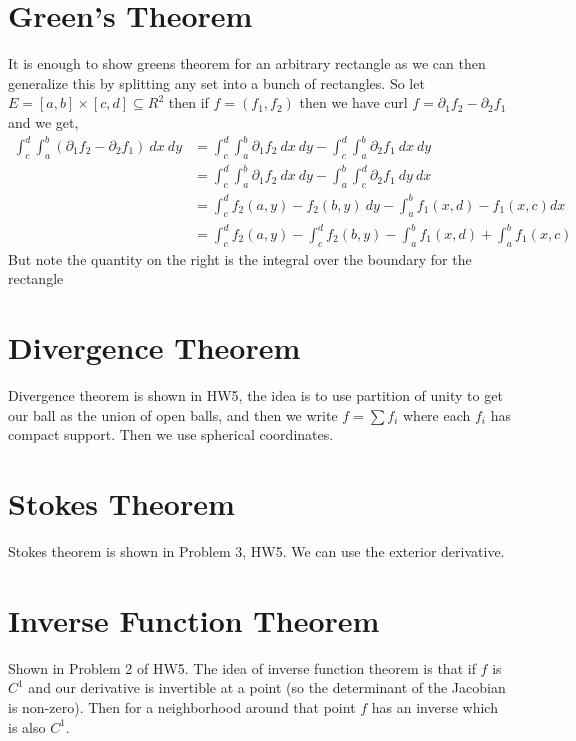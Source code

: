 \section{Green's Theorem}
It is enough to show greens theorem for an arbitrary rectangle as we can then generalize this by splitting any set into a bunch of rectangles. So let $E = [a, b] \times [c, d] \subseteq R^2$ then if $f = (f_{1}, f_{2})$ then we have $\text{curl }f = \partial_{1} f_{2} - \partial_{2}f_{1}$ and we get,
\begin{align*}
  \int_{c}^{d}  \int_{a}^{b} (\partial_{1} f_{2} - \partial_{2} f_{1}) \ dx \ dy &=   \int_{c}^{d}  \int_{a}^{b} \partial_{1} f_{2}  \ dx \ dy -   \int_{c}^{d}  \int_{a}^{b}  \partial_{2} f_{1} \ dx \ dy\\
&=   \int_{c}^{d}  \int_{a}^{b} \partial_{1} f_{2}  \ dx \ dy -  \int_{a}^{b}  \int_{c}^{d}   \partial_{2} f_{1} \ dy \ dx\\
&=   \int_{c}^{d}  f_{2}(a, y) - f_{2}(b, y) \ dy -  \int_{a}^{b} f_{1}(x, d) - f_{1}(x, c) dx\\
&=   \int_{c}^{d}  f_{2}(a, y) -  \int_{c}^{d}f_{2}(b, y) -  \int_{a}^{b} f_{1}(x, d) + \int_{a}^{b}  f_{1}(x, c)
\end{align*}
But note the quantity on the right is the integral over the boundary for the rectangle

\section{Divergence Theorem}
Divergence theorem is shown in HW5, the idea is to use partition of unity to get our ball as the union of open balls, and then we write $f = \sum f_i$ where each $f_i$ has compact support. Then we use spherical coordinates.

\vspace{1em}

\section{Stokes Theorem}
Stokes theorem is shown in Problem 3, HW5. We can use the exterior derivative.

\section{Inverse Function Theorem}

Shown in Problem 2 of HW5. The idea of inverse function theorem is that if $f$ is $C^{1}$ and our derivative is invertible at a point (so the determinant of the Jacobian is non-zero). Then for a neighborhood around that point $f$ has an inverse which is also $C^{1}$.

